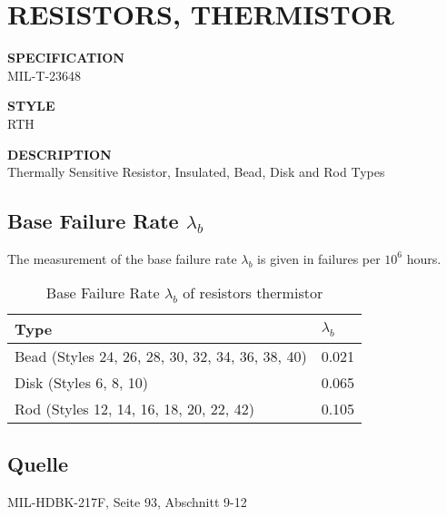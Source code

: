 \section{RESISTORS, THERMISTOR}

\begin{minipage}[t]{0.24\textwidth}
    \textbf{SPECIFICATION}\\
    MIL-T-23648
\end{minipage}
\begin{minipage}[t]{0.12\textwidth}
    \textbf{STYLE}\\
    RTH
\end{minipage}
\begin{minipage}[t]{0.61\textwidth}
    \textbf{DESCRIPTION}\\
    Thermally Sensitive Resistor, Insulated, Bead, Disk and Rod Types
\end{minipage}

\subsection{Base Failure Rate $\lambda_b$}
The measurement of the base failure rate $\lambda_b$ is given in failures per $10^6$ hours.
\begin{table}[ht]
{\centering

\begin{tabular}{|p{7.5cm}|p{5cm}|}
    \hline
    \textbf{Type} & \textbf{$\lambda_b$} \\
    \hline
    Bead (Styles 24, 26, 28, 30, 32, 34, 36, 38, 40) & 0.021 \\
    \hline
    Disk (Styles 6, 8, 10) & 0.065 \\
    \hline
    Rod (Styles 12, 14, 16, 18, 20, 22, 42) & 0.105 \\
    \hline
\end{tabular}

\caption{Base Failure Rate $\lambda_b$ of resistors thermistor}

\label{tab:bfr_resistors_thermistor}
\par}
\subsection*{Quelle}
MIL-HDBK-217F, Seite 93, Abschnitt 9-12
\end{table}